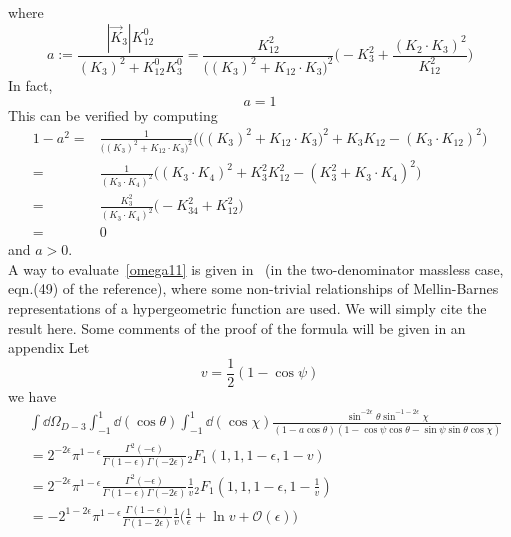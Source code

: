 where 
\begin{equation*}
a := \frac{|\vec{K}_3|K_{12}^0}{(K_3)^2 + K_{12}^0 K_3^0}
= \frac{K_{12}^2}{\big((K_3)^2 + K_{12}\cdot K_3\big)^2}\Big( -K_3^2 + \frac{(K_2\cdot K_3)^2}{K_{12}^2}\Big)
\end{equation*}
In fact, 
\begin{equation*}
a = 1
\end{equation*}
This can be verified by computing
\begin{equation*}
\begin{split}
1-a^2 = &
\frac{1}{\big((K_3)^2 + K_{12}\cdot K_3\big)^2}
\Big( \big( (K_3)^2 + K_{12}\cdot K_3 \big)^2 + K_3K_{12} - (K_3\cdot K_{12})^2
\Big)
\\
= &
\frac{1}{(K_3\cdot K_4)^2} \Big( (K_3\cdot K_4)^2 + K_3^2K_{12}^2 - (K_3^2 + K_3\cdot K_4)^2 \Big)
\\
= &
\frac{K_3^2}{(K_3\cdot K_4)^2}\Big(-K_{34}^2 + K_{12}^2\Big)
\\
= & 0
\end{split}
\end{equation*}
and $a>0$.
\\
A way to evaluate~\cref{omega11} is given in~\cite{Somogyi:2011ir} (in the two-denominator massless case, eqn.(49) of the reference), where some non-trivial relationships of Mellin-Barnes representations of a hypergeometric function are used.
We will simply cite the result here.
\color{red} 
Some comments of the proof of the formula will be given in an appendix
\color{black}
Let 
\begin{equation*}
v = \frac{1}{2}(1-\cos\psi)
\end{equation*}
we have
\begin{equation*}
\begin{split}
& \int \dd \Omega_{D-3}
\int_{-1}^1 \dd(\cos\theta)\int_{-1}^1\dd(\cos \chi)\frac{\sin^{-2\epsilon}\theta \sin^{-1-2\epsilon}\chi}{(1-a\cos\theta)(1-\cos\psi\cos\theta  - \sin\psi\sin\theta\cos\chi)}
\\
& = 
2^{-2\epsilon}\pi^{1-\epsilon}\frac{\Gamma^2(-\epsilon)}{\Gamma(1-\epsilon)\Gamma(-2\epsilon)}{}_2F_1(1,1,1-\epsilon, 1-v)
\\
& = 
2^{-2\epsilon}\pi^{1-\epsilon}\frac{\Gamma^2(-\epsilon)}{\Gamma(1-\epsilon)\Gamma(-2\epsilon)} \frac{1}{v}{}_2F_1(1,1,1-\epsilon, 1-\frac{1}{v})
\\
& = 
-2^{1-2\epsilon}\pi^{1-\epsilon} \frac{\Gamma(1-\epsilon)}{\Gamma(1-2\epsilon)}\frac{1}{v}\Big(\frac{1}{\epsilon}
+\ln v + \mathcal{O}(\epsilon)\Big)
\end{split}
\end{equation*}
